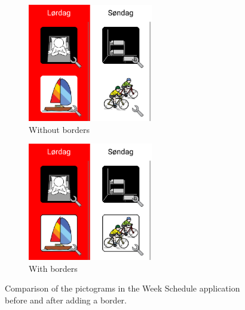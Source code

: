 \begin{figure}[ht]
    \centering
        \begin{subfigure}[t]{0.5\textwidth}
        \centering
        \includegraphics[width=0.6\textwidth]{figures/img/screenshots/old_week_schedule_no_borders.png}
        \caption{Without borders}
    \end{subfigure}\hfill
        \begin{subfigure}[t]{0.5\textwidth}
        \centering
        \includegraphics[width=0.6\textwidth]{figures/img/screenshots/new_week_schedule_with_borders.png}
        \caption{With borders}
    \end{subfigure}
    \caption{Comparison of the pictograms in the Week Schedule application before and after adding a border.}
    \label{fig:before-after-borders}
\end{figure}

